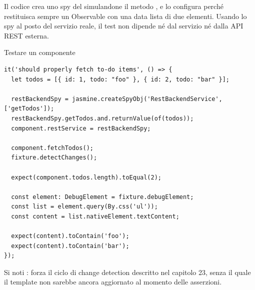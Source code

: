 Il codice crea uno spy del  simulandone il metodo
, e lo configura perché restituisca sempre un Observable con
una data lista di due elementi. Usando lo spy al posto del servizio reale, il
test non dipende né dal servizio né dalla API REST esterna.

\begin{esempio}{Testare un componente}
\begin{affianco}[0.6][c]
\codicepiccolo
\begin{lstlisting}[style=ts, name=todo-page.component.spec.ts]
it('should properly fetch to-do items', () => {
  let todos = [{ id: 1, todo: "foo" }, { id: 2, todo: "bar" }];

  restBackendSpy = jasmine.createSpyObj('RestBackendService', ['getTodos']);
  restBackendSpy.getTodos.and.returnValue(of(todos));
  component.restService = restBackendSpy;

  component.fetchTodos();
  fixture.detectChanges();

  expect(component.todos.length).toEqual(2);

  const element: DebugElement = fixture.debugElement;
  const list = element.query(By.css('ul'));
  const content = list.nativeElement.textContent;

  expect(content).toContain('foo');
  expect(content).toContain('bar');
});
\end{lstlisting}
\risultato
\begin{immagine}
\end{immagine}
\end{affianco}

Si noti : forza il ciclo di change detection
descritto nel capitolo 23, senza il quale il template non sarebbe ancora
aggiornato al momento delle asserzioni.
\end{esempio}

